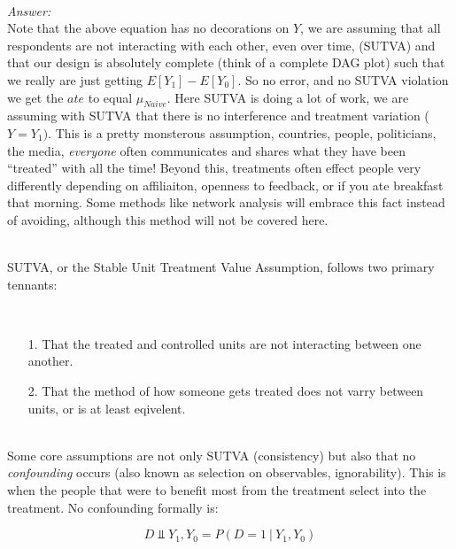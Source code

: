 \documentclass[12pt]{article}\usepackage[]{graphicx}\usepackage[]{color}
\begin{document}
\begin{flushleft}
\hfill \\

\noindent \textit{Answer:}\\

Note that the above equation has no decorations on $Y$, we are assuming that all respondents are not interacting with each other, even over time, (SUTVA) and that our design is absolutely complete (think of a complete DAG plot) such that we really are just getting $ E[Y_1] - E[Y_0]$. So no error, and no SUTVA violation we get the $ate$ to equal $\mu_{Naive}$.  Here SUTVA is doing a lot of work, we are assuming with SUTVA that there is no interference and treatment variation ($ Y = Y_1)$. This is a pretty monsterous assumption, countries, people, politicians, the media, \textit{everyone} often communicates and shares what they have been ``treated'' with all the time! Beyond this, treatments often effect people very differently depending on affiliaiton, openness to feedback, or if you ate breakfast that morning. Some methods like network analysis will embrace this fact instead of avoiding, although this method will not be covered here.

\hfill \\

\noindent SUTVA, or the Stable Unit Treatment Value Assumption, follows two primary tennants:

\hfill \\

\begin{itemize}
\item[1.] That the treated and controlled units are not interacting between one another.
\item[2.] That the method of how someone gets treated does not varry between units, or is at least eqivelent.
\end{itemize}

\hfill \\

\noindent Some core assumptions are not only SUTVA (consistency) but also that no \textit{confounding} occurs (also known as selection on observables, ignorability). This is when the people that were to benefit most from the treatment select into the treatment. No confounding formally is:   

\begin{equation}
D \Vbar Y_1, Y_0 = P(D=1 ~ | ~ Y_1, Y_0)
\end{equation}


\end{flushleft}
\end{document}
